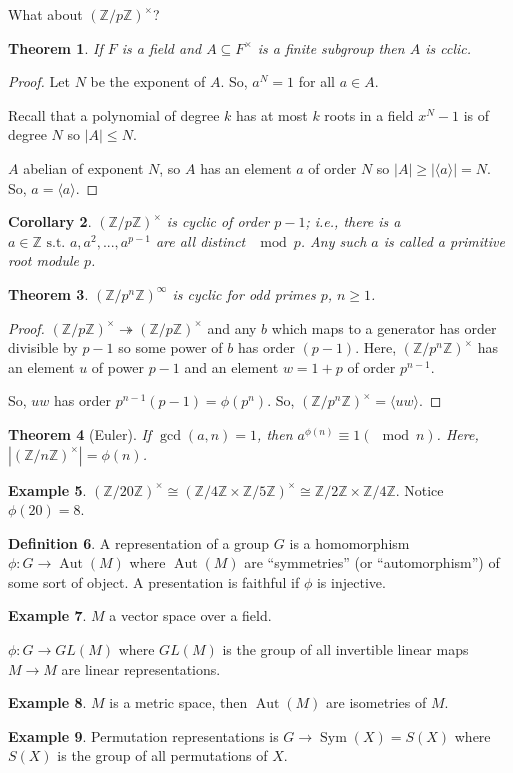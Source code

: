 \documentclass{amsart}
\newtheorem{thm}{Theorem}[section]
\newtheorem{cor}[thm]{Corollary}
\theoremstyle{definition}
\newtheorem{definition}[thm]{Definition}
\newtheorem{example}[thm]{Example}
\newcommand{\Z}{\mathbb Z}
\newcommand{\st}{\text{ s.t. }}
\DeclareMathOperator{\Sym}{Sym}
\DeclareMathOperator{\Aut}{Aut}
\begin{document}
What about $(\Z/p\Z)^\times$?
\begin{thm}
	If $F$ is a field and $A\subseteq F^\times$ is a finite subgroup then $A$ is cclic.
\end{thm}
\begin{proof}
	Let $N$ be the exponent of $A$. So, $a^N=1$ for all $a\in A$.
	
	Recall that a polynomial of degree $k$ has at most $k$ roots in a field $x^N-1$ is of degree $N$ so $|A|\leq N$.
	
	$A$ abelian of exponent $N$, so $A$ has an element $a$ of order $N$ so $|A|\geq |\langle a \rangle|=N$. So, $a=\langle a\rangle$.
\end{proof}
\begin{cor}
$(\Z/p\Z)^\times$ is cyclic of order $p-1$; i.e., there is a $a\in \Z\st a,a^2,...,a^{p-1}$ are all distinct $\mod p$. Any such $a$ is called a primitive root module $p$. 	
\end{cor}
\begin{thm}
	$(\Z/p^n\Z)^\infty$ is cyclic for odd primes $p$, $n\geq 1$.
\end{thm}
\begin{proof}
	$(\Z/p\Z)^\times\twoheadrightarrow(\Z/p\Z)^\times$ and any $b$ which maps to a generator has order divisible by $p-1$ so some power of $b$ has order $(p-1)$. Here, $(\Z/p^n\Z)^\times$ has an element $u$ of power $p-1$ and an element $w=1+p$ of order $p^{n-1}$.
	
	So, $uw$ has order $p^{n-1}(p-1)=\phi(p^n)$. So, $(\Z/p^n\Z)^\times=\langle uw\rangle$.
\end{proof}
\begin{thm}[Euler]
	If $\gcd(a,n)=1$, then $a^{\phi(n)}\equiv 1(\mod n)$. Here, $|(\Z/n\Z)^\times|=\phi(n)$.
\end{thm}
\begin{example}
	$(\Z/20\Z)^\times\cong(\Z/4\Z\times\Z/5\Z)^\times\cong\Z/2\Z\times\Z/4\Z$. Notice $\phi(20)=8$.
\end{example}
\begin{definition}
	A representation of a group $G$ is a homomorphism $\phi:G\to \Aut(M)$ where $\Aut(M)$ are ``symmetries'' (or ``automorphism'') of some sort of object. A presentation is faithful if $\phi$ is injective.
\end{definition}
\begin{example}
	$M$ a vector space over a field.
	
	$\phi:G\to GL(M)$ where $GL(M)$ is the group of all invertible linear maps $M\to M$ are linear representations.
\end{example}
\begin{example}
	$M$ is a metric space, then $\Aut(M)$ are isometries of $M$.
\end{example}
\begin{example}
	Permutation representations is $G\to\Sym(X)=S(X)$ where $S(X)$ is the group of all permutations of $X$.
\end{example}
\end{document}

